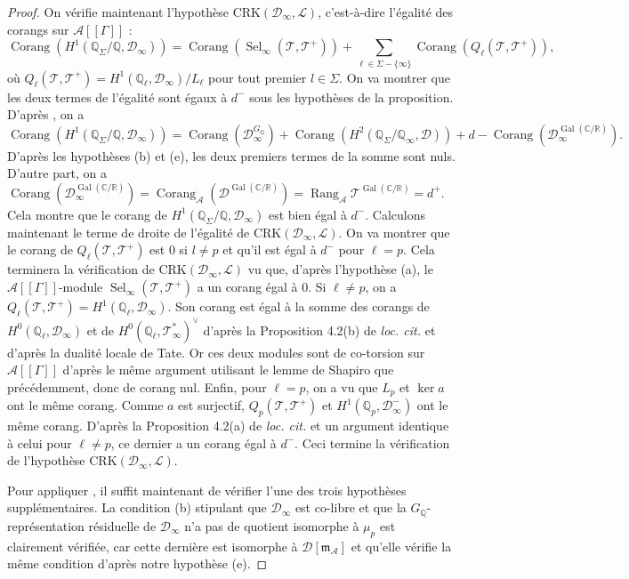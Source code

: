 \documentclass[12pt]{amsart}
\newcommand\bR{\mathbb{R}}
\newcommand\bC{\mathbb{C}}
\newcommand\bQ{\mathbb{Q}}
\newcommand\Qp{\mathbb{Q}_{p}}
\newcommand\cA{\mathcal{A}}
\newcommand\cD{\mathcal{D}}
\newcommand\cL{\mathcal{L}}
\newcommand\cT{\mathcal{T}}
\newcommand\gm{\mathfrak{m}}
\DeclareMathOperator{\Gal}{Gal}
\DeclareMathOperator{\rg}{Rang}
\DeclareMathOperator{\corg}{Corang}
\DeclareMathOperator{\Sel}{Sel}
\theoremstyle{defstyle}
\theoremstyle{thmstyle}
\begin{document}
\begin{proof}
	On vérifie maintenant l'hypothèse $\textrm{CRK}(\cD_\infty,\cL)$, c'est-à-dire l'égalité des corangs sur $\cA[[\Gamma]]$ : 
	$$\corg (H^1(\bQ_\Sigma/\bQ,\cD_\infty)) = \corg (\Sel_\infty(\cT,\cT^+)) + \sum_{\ell\in \Sigma-\{\infty\}} \corg (Q_\ell(\cT,\cT^+)),$$
	où $Q_\ell(\cT,\cT^+)=H^1(\bQ_\ell,\cD_\infty)/L_\ell$ pour tout premier $l \in \Sigma$. On va montrer que les deux termes de l'égalité sont égaux à $d^-$ sous les hypothèses de la proposition. D'après \cite[Proposition 4.1]{greenberg2006structure}, on a 
	$$\corg(H^1(\bQ_\Sigma/\bQ,\cD_\infty)) = \corg(\cD_\infty^{G_\bQ}) + \corg(H^2(\bQ_\Sigma/\bQ_\infty,\cD)) + d- \corg(\cD_\infty^{\Gal(\bC/\bR)}).$$
	D'après les hypothèses (b) et (e), les deux premiers termes de la somme sont nuls. D'autre part, on a $\corg(\cD_\infty^{\Gal(\bC/\bR)}) = \corg_{\cA} (\cD^{\Gal(\bC/\bR)}) = \rg_{\cA} \cT^{\Gal(\bC/\bR)} =d^+$. Cela montre que le corang de $H^1(\bQ_\Sigma/\bQ,\cD_\infty)$ est bien égal à $d^-$.  Calculons maintenant le terme de droite de l'égalité de $\textrm{CRK}(\cD_\infty,\cL)$. On va montrer que le corang de $Q_\ell(\cT,\cT^+)$ est $0$ si $l\neq p$ et qu'il est égal à $d^-$ pour $\ell=p$. Cela terminera la vérification de $\textrm{CRK}(\cD_\infty,\cL)$ vu que, d'après l'hypothèse (a), le $\cA[[\Gamma]]$-module $\Sel_\infty(\cT,\cT^+)$ a un corang égal à 0. Si $\ell\neq p$, on a $Q_\ell(\cT,\cT^+) = H^1(\bQ_\ell,\cD_\infty)$. Son corang est égal à la somme des corangs de $H^0(\bQ_\ell,\cD_\infty)$ et de $H^0(\bQ_\ell,\cT_\infty^*)^\vee$ d'après la Proposition 4.2(b) de \textit{loc. cit.} et d'après la dualité locale de Tate. Or ces deux modules sont de co-torsion sur $\cA[[\Gamma]]$ d'après le même argument utilisant le lemme de Shapiro que précédemment, donc de corang nul. Enfin, pour $\ell=p$, on a vu que $L_p$ et $\ker a$ ont le même corang. Comme $a$ est surjectif, $Q_p(\cT,\cT^+)$ et $H^1(\Qp,\cD_\infty^-)$ ont le même corang. D'après la Proposition 4.2(a) de \textit{loc. cit.} et un argument identique à celui pour $\ell\neq p$, ce dernier a un corang égal à $d^-$. Ceci termine la vérification de l'hypothèse $\textrm{CRK}(\cD_\infty,\cL)$. 
	
	Pour appliquer \cite[Proposition 4.1.1]{greenberg2015structure}, il suffit maintenant de vérifier l'une des trois hypothèses supplémentaires. La condition (b) stipulant que $\cD_\infty$ est co-libre et que  la $G_{\bQ}$-représentation résiduelle de $\cD_\infty$ n'a pas de quotient isomorphe à $\mu_p$ est clairement vérifiée, car cette dernière est isomorphe à $\cD[\gm_{\cA}]$ et qu'elle vérifie la même condition d'après notre hypothèse (e).
\end{proof}
	
\end{document}

